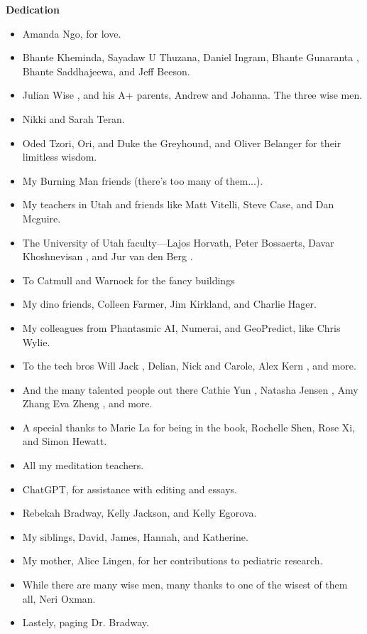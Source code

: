 \begin{titlepage}
    \centering
    {\Huge \bfseries Dedication}\par
    \vspace{2cm}
    \begin{itemize}
        \item Amanda Ngo, for love. \cite{gafori} \cite{bradway} \cite{green}
        \item Bhante Kheminda, Sayadaw U Thuzana, Daniel Ingram, Bhante Gunaranta \cite{guna} \cite{bhavana}, Bhante Saddhajeewa, and Jeff Beeson.
        \item Julian Wise \cite{yale}, and his A+ parents, Andrew and Johanna. The three wise men.
        \item Nikki and Sarah Teran.
        \item Oded Tzori, Ori, and Duke the Greyhound, and Oliver Belanger for their limitless wisdom.
        \item My Burning Man friends (there's too many of them...).
        \item My teachers in Utah and friends like Matt Vitelli, Steve Case, and Dan Mcguire.
        \item The University of Utah faculty—Lajos Horvath, Peter Bossaerts, Davar Khoshnevisan \cite{davar}, and Jur van den Berg \cite{utah}.
        \item To Catmull and Warnock for the fancy buildings \cite{utah}
        \item My dino friends, Colleen Farmer, Jim Kirkland, and Charlie Hager.
        \item My colleagues from Phantasmic AI, Numerai, and GeoPredict, like Chris Wylie.
        \item To the tech bros Will Jack \cite{mit}, Delian, Nick and Carole, Alex Kern \cite{berkeley}, and more.
        \item And the many talented people out there Cathie Yun \cite{mit}, Natasha Jensen \cite{mit}, Amy Zhang \cite{mit} Eva Zheng \cite{berkeley}, and more.
        \item A special thanks to Marie La for being in the book, Rochelle Shen, Rose Xi, and Simon Hewatt.
        \item All my meditation teachers.
        \item ChatGPT, for assistance with editing and essays.
        \item Rebekah Bradway, Kelly Jackson, and Kelly Egorova.
        \item My siblings, David, James, Hannah, and Katherine.
        \item My mother, Alice Lingen, for her contributions to pediatric research.
        \item While there are many wise men, many thanks to one of the wisest of them all, Neri Oxman.
        \item Lastely, paging Dr. Bradway.
    \end{itemize}
    \vfill
\end{titlepage}
